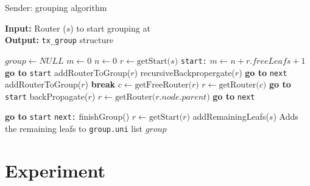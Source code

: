 \begin{algorithm}
    \caption{Sender: grouping algorithm}\label{alg:sender_grouping}
    \hspace*{\algorithmicindent} \textbf{Input:} Router ($s$) to start grouping at\\
    \hspace*{\algorithmicindent} \textbf{Output:} \texttt{tx\_group} structure\\
\begin{algorithmic}[1]
\State $group\gets NULL$
\State $m\gets 0$
\State $n\gets 0$
\State $r\gets \text{getStart($s$)}$
\Label \texttt{start:}
        \State $m\gets n + r.freeLeafs + 1$
            \State \textbf{go to} \texttt{start}
            \State addRouterToGroup($r$)
            \State recursiveBackpropergate($r$)
            \State \textbf{go to} \texttt{next}
            \State addRouterToGroup($r$)
            \State \textbf{break}
        \EndIf
    \EndWhile
        \State $c\gets \text{getFreeRouter($r$)}$
            \State $r\gets \text{getRouter($c$)}$
            \State \textbf{go to} \texttt{start}
        \EndIf
    \EndWhile
        \State backPropagate($r$)
        \State $r\gets \text{getRouter($r.node.parent$)}$
            \State \textbf{go to} \texttt{next}
        \EndIf

        \State \textbf{go to} \texttt{start}
    \EndIf
\Label \texttt{next:}
    \State finishGroup()
    \State $r\gets \text{getStart($r$)}$
\EndWhile
    \State addRemainingLeafs($s$)
    \Comment Adds the remaining leafs to \texttt{group.uni} list 
    \State \Return $group$
\end{algorithmic}
\end{algorithm}


\section{Experiment} %
\label{sec:Experiment}

